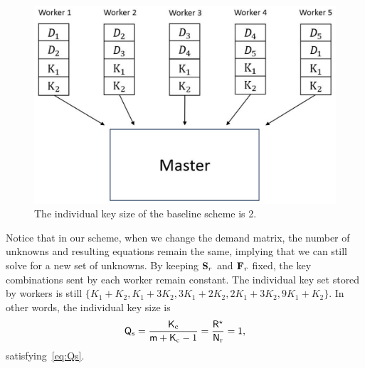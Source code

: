\documentclass[conference,letterpaper]{IEEEtran}
\begin{document}
\begin{example}
\begin{figure}%
\centerline{\includegraphics[scale=0.25]{other scheme}}
\caption{\small The individual key size of the baseline scheme is 2.}
\label{fig: other scheme}
\end{figure}



Notice that in our scheme, when we change the demand matrix, the number of unknowns and resulting equations remain the same, implying that we can still solve for a new set of unknowns. By keeping ${\bf S}_r$ and ${\bf F}_r$ fixed, the key combinations sent by each worker remain constant. The individual key set stored by workers is still $\{K_1 +K_2, K_1 +3K_2, 3K_1 +2K_2, 2K_1 +3K_2, 9K_1 +K_2\}$. In other words, the individual key size is 
\begin{align}
    {\sf Q}_{\rm s} = \frac{{\sf K}_{\rm c}}{{\sf m} + {\sf K}_{\rm c} - 1} = \frac{{\sf R}^{\star}}{{\sf N}_{\rm r}} = 1,
\end{align}
satisfying~\eqref{eq:Qs}.
\end{example}
\end{document}
